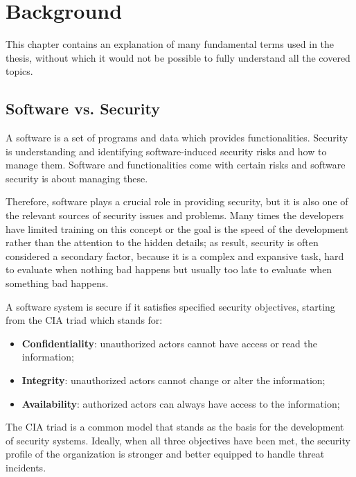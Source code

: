 \chapter{Background}
\label{cha:background}


This chapter contains an explanation of many fundamental terms used in the thesis, without which it would not be possible to fully understand all the covered topics.

\section{Software vs. Security}

A software is a set of programs and data which provides functionalities. Security is understanding and identifying software-induced security risks and how to manage them. Software and functionalities come with certain risks and software security is about managing these.

Therefore, software plays a crucial role in providing security, but it is also one of the relevant sources of security issues and problems. Many times the developers have limited training on this concept or the goal is the speed of the development rather than the attention to the hidden details; as result, security is often considered a secondary factor, because it is a complex and expansive task, hard to evaluate when nothing bad happens but usually too late to evaluate when something bad happens.~\cite{marchetto-st-slides}

A software system is secure if it satisfies specified security objectives, starting from the CIA triad which stands for:
\begin{itemize}
  \item \textbf{Confidentiality}: unauthorized actors cannot have access or read the information;
  \item \textbf{Integrity}: unauthorized actors cannot change or alter the information;
  \item \textbf{Availability}: authorized actors can always have access to the information;
\end{itemize}
The CIA triad is a common model that stands as the basis for the development of security systems. Ideally, when all three objectives have been met, the security profile of the organization is stronger and better equipped to handle threat incidents.~\cite{cia-triad}

